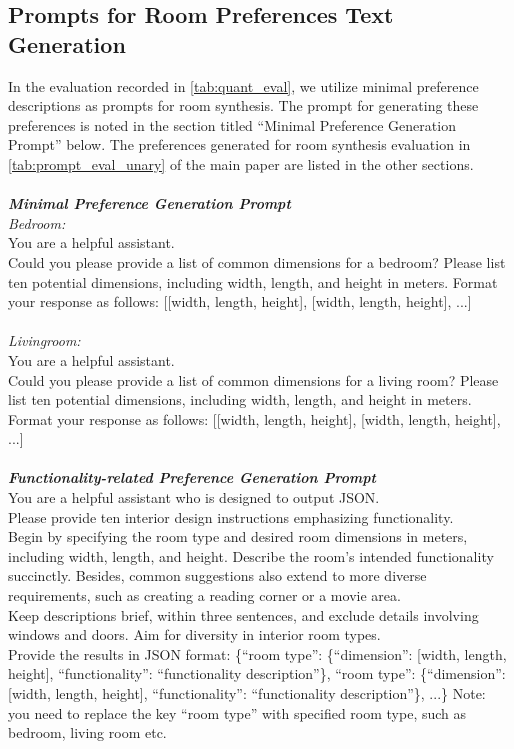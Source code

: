 \subsection{Prompts for Room Preferences Text Generation} 
In the evaluation recorded in \cref{tab:quant_eval}, we utilize minimal preference descriptions as prompts for room synthesis. The prompt for generating these preferences is noted in the section titled ``Minimal Preference Generation Prompt'' below. The preferences generated for room synthesis evaluation in \cref{tab:prompt_eval_unary} of the main paper are listed in the other sections.
\\\\
\noindent
\textit{\textbf{Minimal Preference Generation Prompt}} \\
\textit{Bedroom: }\\
You are a helpful assistant.\\
Could you please provide a list of common dimensions for a bedroom? Please list ten potential dimensions, including width, length, and height in meters. Format your response as follows: [[width, length, height], [width, length, height], ...]
\\\\
\textit{Livingroom: }\\
You are a helpful assistant. \\
Could you please provide a list of common dimensions for a living room? Please list ten potential dimensions, including width, length, and height in meters. Format your response as follows: [[width, length, height], [width, length, height], ...]
\\\\
\noindent
\textit{\textbf{Functionality-related Preference Generation Prompt}}\\
You are a helpful assistant who is designed to output JSON. \\
Please provide ten interior design instructions emphasizing functionality. \\
Begin by specifying the room type and desired room dimensions in meters, including width, length, and height. Describe the room's intended functionality succinctly. Besides, common suggestions also extend to more diverse requirements, such as creating a reading corner or a movie area. \\
Keep descriptions brief, within three sentences, and exclude details involving windows and doors. Aim for diversity in interior room types.\\
Provide the results in JSON format: \{``room type'': \{``dimension'': [width, length, height], ``functionality'': ``functionality description''\}, ``room type'': \{``dimension'': [width, length, height], ``functionality'': ``functionality description''\}, ...\} Note: you need to replace the key ``room type'' with specified room type, such as bedroom, living room etc. 

